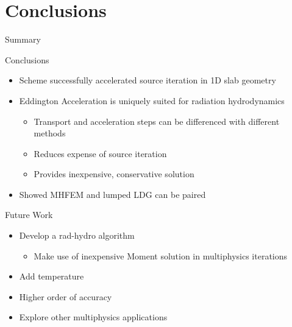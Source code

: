 \documentclass[10pt]{beamer}
\begin{document}
\section{Conclusions}

\begin{frame}{Summary}

    \onslide<+->
    Conclusions
    \begin{itemize} \vspace{-.1in}
        \item Scheme successfully accelerated source iteration in 1D slab geometry 



        \item Eddington Acceleration is uniquely suited for radiation hydrodynamics 
        \begin{itemize}
        	\item Transport and acceleration steps can be differenced with different methods 
        	\item Reduces expense of source iteration 
        	\item Provides inexpensive, conservative solution 
        \end{itemize}

        \item Showed MHFEM and lumped LDG can be paired 

    \end{itemize}

    \onslide<+->
    Future Work 
    \begin{itemize} \vspace{-.1in}
        \item Develop a rad-hydro algorithm 

        \begin{itemize}
            \item Make use of inexpensive Moment solution in multiphysics iterations 
        \end{itemize}

        \item Add temperature 

        \item Higher order of accuracy 

        \item Explore other multiphysics applications 

    \end{itemize}

\end{frame}
\end{document}
